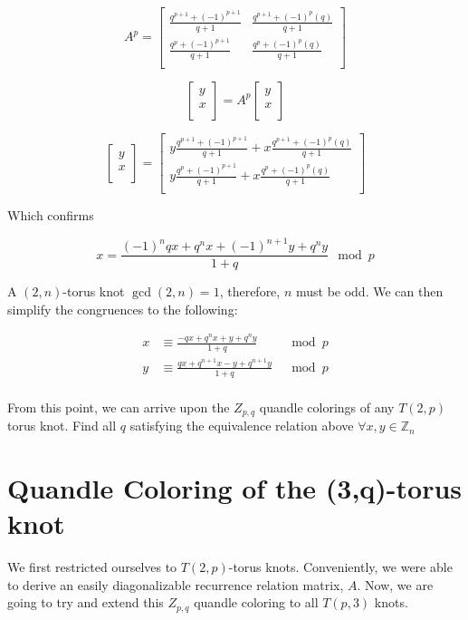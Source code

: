 \documentclass[paper.tex]{subfiles}
\begin{document}
\[
A^{p}=
\left[ \begin{array}{ccc}
\frac{q^{p+1} + (-1)^{p+1}}{q+1} & \frac{q^{p+1} + (-1)^{p}(q)}{q+1} \\
\frac{q^{p} + (-1)^{p+1}}{q+1} & \frac{q^{p} + (-1)^{p}(q)}{q+1} \\
\end{array} \right]
\]

\[
\left[ \begin{array}{ccc}
y \\
x \\
\end{array} \right]=
A^{p}
\left[ \begin{array}{ccc}
y \\
x \\
\end{array} \right]
\]

\[
\left[ \begin{array}{ccc}
y \\
x \\
\end{array} \right]=
\left[ \begin{array}{ccc}
y \frac{q^{p+1} + (-1)^{p+1}}{q+1} + x \frac{q^{p+1} + (-1)^{p}(q)}{q+1} \\
y \frac{q^{p} + (-1)^{p+1}}{q+1} + x \frac{q^{p} + (-1)^{p}(q)}{q+1} \\
\end{array} \right]
\]

Which confirms

$$x = \frac{(-1)^nqx+q^nx+(-1)^{n+1}y+q^ny}{1+q} \mod p $$

A $(2,n)$-torus knot $\gcd(2,n) = 1$, therefore, $n$ must be odd. We can then simplify the congruences to the following:

\begin{align*}
	x &\equiv \frac{-qx+q^nx+y+q^ny}{1+q} & \mod{p} \\
	y &\equiv \frac{qx+q^{n+1}x-y+q^{n+1}y}{1+q} & \mod{p} \\
\end{align*}

From this point, we can arrive upon the $Z_{p,q}$ quandle colorings of any $T(2, p)$ torus knot. Find all $q$ satisfying the equivalence relation above $\forall x,y \in \mathbb{Z}_n$

\section{Quandle Coloring of the (3,q)-torus knot}\label{sec:2ntorus}
We first restricted ourselves to $T(2,p)$-torus knots. Conveniently, we were able to derive an easily diagonalizable recurrence relation matrix, $A$. Now, we are going to try and extend this $Z_{p,q}$ quandle coloring to all $T(p,3)$ knots. 
\end{document}
